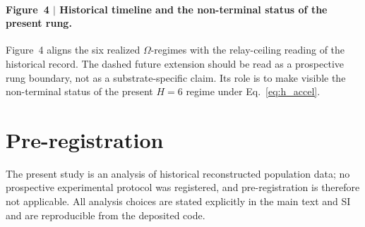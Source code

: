 \documentclass[11pt]{article}
\begin{document}
\paragraph{Figure~4 $\vert$ Historical timeline and the non-terminal status of the present rung.}
Figure~4 aligns the six realized
\(\Omega\)-regimes with the relay-ceiling reading of the historical record.
The dashed future extension should be read as a prospective rung boundary,
not as a substrate-specific claim.
Its role is to make visible the non-terminal status of the present
\(H{=}6\)
regime under Eq.~\eqref{eq:h_accel}.

\section*{Pre-registration}
The present study is an analysis of historical reconstructed population data;
no prospective experimental protocol was registered,
and pre-registration is therefore not applicable.
All analysis choices are stated explicitly in the main text and SI and are reproducible from the deposited code.
\end{document}
